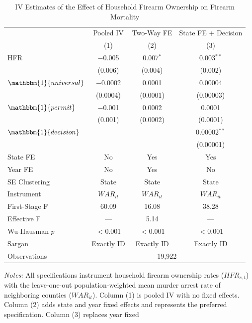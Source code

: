 \begin{table}[!htbp]
\centering
\caption{IV Estimates of the Effect of Household Firearm Ownership 
on Firearm Mortality}
\label{tab:main_results}
\begin{tabular}{lccc}
\toprule
 & Pooled IV & Two-Way FE & State FE + Decision \\
 & (1) & (2) & (3) \\
\midrule
HFR & $-$0.005 & 0.007$^{*}$ & 0.003$^{**}$ \\
    & (0.006)  & (0.004)     & (0.002) \\[0.5em]
$\mathbbm{1}\{universal\}$ & $-$0.0002 & 0.0001 & 0.00004 \\
    & (0.0004) & (0.0001) & (0.00003) \\[0.5em]
$\mathbbm{1}\{permit\}$ & $-$0.001 & 0.0002 & 0.0001 \\
    & (0.001)  & (0.0002) & (0.0001) \\[0.5em]
$\mathbbm{1}\{decision\}$ & & & 0.00002$^{**}$ \\
    & & & (0.00001) \\
\midrule
State FE           & No           & Yes          & Yes \\
Year FE            & No           & Yes          & No \\
SE Clustering      & State        & State        & State \\
Instrument         & $WAR_{it}$   & $WAR_{it}$   & $WAR_{it}$ \\
First-Stage F      & 60.09        & 16.08        & 38.28 \\
Effective F        & ---          & 5.14         & --- \\
Wu-Hausman $p$     & $<$0.001     & $<$0.001     & $<$0.001 \\
Sargan             & Exactly ID   & Exactly ID   & Exactly ID \\
Observations       & \multicolumn{3}{c}{19,922} \\
\bottomrule
\end{tabular}
\begin{minipage}{\textwidth}
\footnotesize
\vspace{4pt}
\textit{Notes:} All specifications instrument household firearm ownership 
rates ($HFR_{s,t}$) with the leave-one-out population-weighted mean murder 
arrest rate of neighboring counties ($WAR_{it}$). Column (1) is pooled IV 
with no fixed effects. Column (2) adds state and year fixed effects and 
represents the preferred specification. Column (3) replaces year fixed 

\end{minipage}
\end{table}
